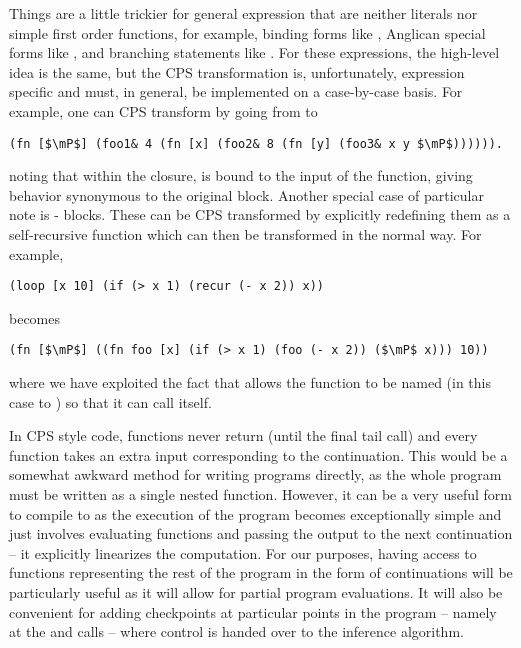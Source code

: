 Things are a little
trickier for general expression that are neither literals nor simple first order functions, for example,
binding forms like , Anglican special forms like \sample, and branching statements like .
For these expressions, the high-level idea is the same, but the CPS transformation is, unfortunately, 
expression specific and must, in general, be implemented on a case-by-case basis.  
For example, one can CPS transform  by going from
 to
 \begin{lstlisting}[basicstyle=\ttfamily\small,frame=none]
 (fn [$\mP$] (foo1& 4 (fn [x] (foo2& 8 (fn [y] (foo3& x y $\mP$)))))).
 \end{lstlisting}\vspace{-8pt}
noting that within the  closure,  is bound to the input of the 
function, giving behavior synonymous to the original
 block.  
Another special case of particular note is - blocks.  These can be CPS
transformed by explicitly redefining them as a self-recursive function which can then
be transformed in the normal way.  For example,
\begin{lstlisting}[basicstyle=\ttfamily\small,frame=none]
(loop [x 10] (if (> x 1) (recur (- x 2)) x))
 \end{lstlisting}\vspace{-8pt}
becomes
\begin{lstlisting}[basicstyle=\ttfamily\small,frame=none]
 (fn [$\mP$] ((fn foo [x] (if (> x 1) (foo (- x 2)) ($\mP$ x))) 10))
 \end{lstlisting}\vspace{-8pt}
where we have exploited the fact that  allows the function to be named (in this case to
) so that it can call itself.
 
In CPS style code, functions never return (until the final tail call) and every function takes an
extra input corresponding to the continuation.  This would be a somewhat awkward method for
writing programs directly, as the whole program must be written as a single nested function.  However,
it can be a very useful form to compile to as the execution of the program becomes
exceptionally simple and just involves evaluating functions and passing the output to the
next continuation -- it explicitly linearizes the computation.  For our purposes, having access
to functions representing the rest of the program in the form of continuations will be
particularly useful as it will allow for partial program evaluations.  It will also be convenient
for adding checkpoints at particular points in the program -- namely at the \sample and
\observe calls -- where control is handed over to the inference algorithm.


